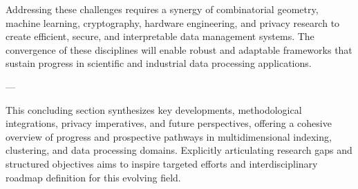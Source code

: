 \documentclass[sigconf]{acmart}
\begin{document}
Addressing these challenges requires a synergy of combinatorial geometry, machine learning, cryptography, hardware engineering, and privacy research to create efficient, secure, and interpretable data management systems. The convergence of these disciplines will enable robust and adaptable frameworks that sustain progress in scientific and industrial data processing applications.

---

This concluding section synthesizes key developments, methodological integrations, privacy imperatives, and future perspectives, offering a cohesive overview of progress and prospective pathways in multidimensional indexing, clustering, and data processing domains. Explicitly articulating research gaps and structured objectives aims to inspire targeted efforts and interdisciplinary roadmap definition for this evolving field.



\end{document}
